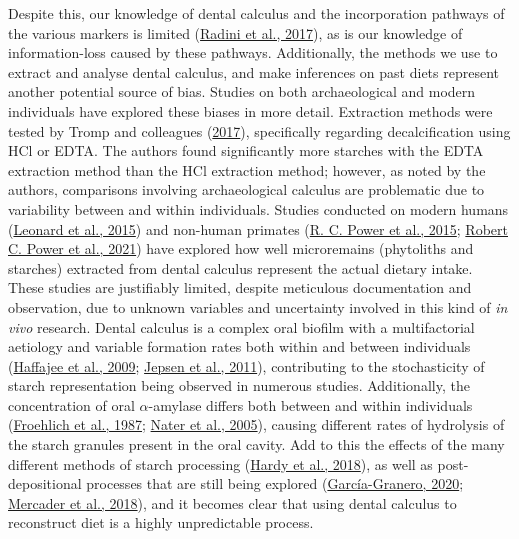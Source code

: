 \documentclass[
  b5paper,
]{book}
\begin{document}
Despite this, our knowledge of dental calculus and the incorporation
pathways of the various markers is limited
(\protect\hyperlink{ref-radiniFoodPathways2017}{Radini et al., 2017}),
as is our knowledge of information-loss caused by these pathways.
Additionally, the methods we use to extract and analyse dental calculus,
and make inferences on past diets represent another potential source of
bias. Studies on both archaeological and modern individuals have
explored these biases in more detail. Extraction methods were tested by
Tromp and colleagues
(\protect\hyperlink{ref-trompEDTACalculus2017}{2017}), specifically
regarding decalcification using HCl or EDTA. The authors found
significantly more starches with the EDTA extraction method than the HCl
extraction method; however, as noted by the authors, comparisons
involving archaeological calculus are problematic due to variability
between and within individuals. Studies conducted on modern humans
(\protect\hyperlink{ref-leonardPlantMicroremains2015}{Leonard et al.,
2015}) and non-human primates
(\protect\hyperlink{ref-powerChimpCalculus2015}{R. C. Power et al.,
2015}; \protect\hyperlink{ref-powerRepresentativenessDental2021}{Robert
C. Power et al., 2021}) have explored how well microremains (phytoliths
and starches) extracted from dental calculus represent the actual
dietary intake. These studies are justifiably limited, despite
meticulous documentation and observation, due to unknown variables and
uncertainty involved in this kind of \emph{in vivo} research. Dental
calculus is a complex oral biofilm with a multifactorial aetiology and
variable formation rates both within and between individuals
(\protect\hyperlink{ref-haffajeeBiofilmPosition2009}{Haffajee et al.,
2009}; \protect\hyperlink{ref-jepsenCalculusRemoval2011}{Jepsen et al.,
2011}), contributing to the stochasticity of starch representation being
observed in numerous studies. Additionally, the concentration of oral
\(\alpha\)-amylase differs both between and within individuals
(\protect\hyperlink{ref-froehlichEffectOral1987}{Froehlich et al.,
1987}; \protect\hyperlink{ref-naterHumanAmylase2005}{Nater et al.,
2005}), causing different rates of hydrolysis of the starch granules
present in the oral cavity. Add to this the effects of the many
different methods of starch processing
(\protect\hyperlink{ref-hardyRecoveringInformation2018}{Hardy et al.,
2018}), as well as post-depositional processes that are still being
explored
(\protect\hyperlink{ref-graneroStarchTaphonomy2020}{García-Granero,
2020};
\protect\hyperlink{ref-mercaderExaggeratedExpectations2018}{Mercader et
al., 2018}), and it becomes clear that using dental calculus to
reconstruct diet is a highly unpredictable process.
\end{document}
